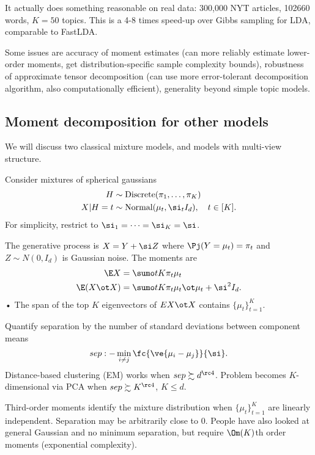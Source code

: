 It actually does something reasonable on real data: 300,000 NYT articles, 102660 words, $K=50$ topics. This is a 4-8 times speed-up over Gibbs sampling for LDA, comparable to FastLDA.


Some issues are accuracy of moment estimates (can more reliably estimate lower-order moments, get distribution-specific sample complexity bounds), robustness of approximate tensor decomposition (can use more error-tolerant decomposition algorithm, also computationally efficient), generality beyond simple topic models. 

\subsection{Moment decomposition for other models}


We will discuss two classical mixture models, and models with multi-view structure.

Consider mixtures of spherical gaussians
\begin{align}
H&\sim \text{Discrete}(\pi_1,\ldots, \pi_K)\\
X|H=t&\sim \text{Normal}(\mu_t,\si_t I_d),\quad t\in [K].
\end{align}
For simplicity, restrict to $\si_1=\cdots =\si_K=\si$.

The generative process is $X=Y+\si Z$ where $\Pj(Y=\mu_t) = \pi_t$  and $Z\sim N(0,I_d)$ is Gaussian noise.
The moments are
\begin{align}
\E X & = \sumo tK \pi_t \mu_t\\
\E(X\ot X) &= \sumo tK \pi_t \mu_t\ot \mu_t + \si^2 I_d.
\end{align}•
The span of the top $K$ eigenvectors of $E X\ot X$ contains $\{\mu_t\}_{t=1}^K$. 

Quantify separation by the number of standard deviations between component means
$$
sep :- \min_{i\ne j}\fc{\ve{\mu_i-\mu_j}}{\si}.
$$
Distance-based clustering (EM) works when $sep \succsim d^{\rc 4}$. Problem becomes $K$-dimensional via PCA when $sep\succsim K^{\rc 4}$, $K\le d$.

Third-order moments identify the mixture distribution when $\{\mu_t\}_{t=1}^K$ are linearly independent. Separation may be arbitrarily close to 0. People have also looked at general Gaussian and no minimum separation, but require $\Om(K)$th order moments (exponential complexity).


